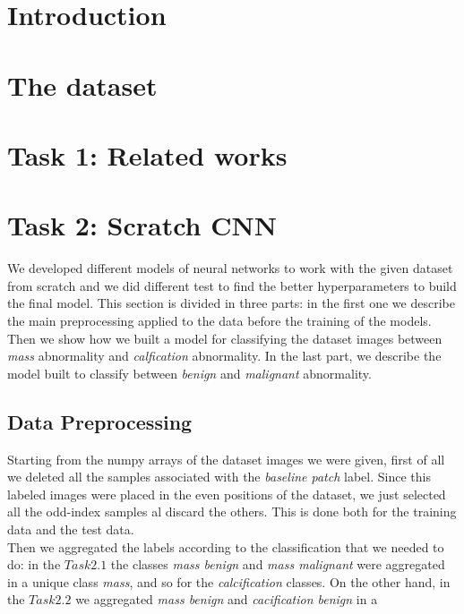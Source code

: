 \documentclass[11pt,a4paper,oneside]{article}
\begin{document}
\baselineskip 22pt


\tableofcontents\thispagestyle{empty}\clearpage

\section{Introduction}
\baselineskip 12pt

\section{The dataset}


\section{Task 1: Related works}



\section{Task 2: Scratch CNN}
We developed different models of neural networks to work with the given dataset from scratch and we did different test to find the better hyperparameters to build the final model. This section is divided in three parts: in the first one we describe the main preprocessing applied to the data before the training of the models. Then we show how we built a model for classifying the dataset images between \textit{mass} abnormality and \textit{calfication} abnormality. In the last part, we describe the model built to classify between \textit{benign} and \textit{malignant} abnormality.

\subsection{Data Preprocessing}
Starting from the numpy arrays of the dataset images we were given, first of all we deleted all the samples associated with the \textit{baseline patch} label. Since this labeled images were placed in the even positions of the dataset, we just selected all the odd-index samples al discard the others. This is done both for the training data and the test data. \\
Then we aggregated the labels according to the classification that we needed to do: in the $Task 2.1$ the classes \textit{mass benign} and  \textit{mass malignant} were aggregated in a unique class \textit{mass}, and so for the \textit{calcification} classes. On the other hand, in the $Task 2.2$ we aggregated  \textit{mass benign} and  \textit{cacification benign} in a 
\end{document}
